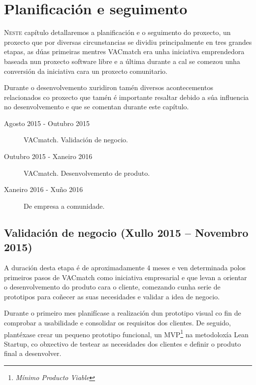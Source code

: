 \chapter{Planificación e seguimento}
\minitoc


  \lettrine{N}{este} capítulo detallaremos a planificación e o seguimento 
do proxecto, un proxecto que por diversas circunstancias se dividiu 
principalmente en tres grandes etapas, as dúas primeiras mentres VACmatch era 
unha iniciativa emprendedora baseada nun proxecto software libre e a última 
durante a cal se comezou unha conversión da iniciativa cara un proxecto 
comunitario.

  Durante o desenvolvemento xuridiron tamén diversos acontecementos 
relacionados co proxecto que tamén é importante resaltar debido a súa 
influencia no desenvolvemento e que se comentan durante este capítulo.

  \begin{description}
    \item [Agosto 2015 - Outubro 2015] VACmatch. Validación de negocio.
    \item [Outubro 2015 - Xaneiro 2016] VACmatch. Desenvolvemento de produto.
    \item [Xaneiro 2016 - Xuño 2016] De empresa a comunidade.
  \end{description}


  \section{Validación de negocio (Xullo 2015 -- Novembro 2015)}
  A duración desta etapa é de aproximadamente 4 meses e ven determinada polos 
primeiros pasos de VACmatch como iniciativa empresarial e que levan a orientar 
o desenvolvemento do produto cara o cliente, comezando cunha serie de 
prototipos para coñecer as suas necesidades e validar a idea de 
negocio.

  Durante o primeiro mes planifícase a realización dun prototipo visual co 
fin de comprobar a usabilidade e consolidar os requisitos dos clientes.
  De seguido, plantéxase crear un pequeno prototipo funcional, un 
MVP\footnote{\emph{Mínimo 
Producto Viable}} na metodoloxía Lean Startup, co obxectivo de testear as 
necesidades dos clientes e definir o produto final a desenvolver.

